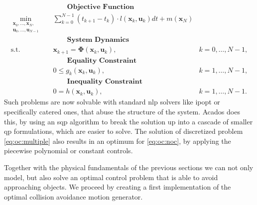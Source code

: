 \begin{subequations}
  \label{eq:oc:multiple}
  \begin{align}
    & \qquad \textbf{Objective Function} \nonumber \\
    \min_{\substack{\bm x_0, \dots, \bm x_N, \\ \bm u_0, \dots, \bm u_{N-1}}} \quad
    & \sum_{k=0}^{N-1} (t_{k+1}-t_k) \cdot l\left(\bm x_k, \bm u_k\right) dt
      + m(\bm x_N) \label{eq:oc:multiple:obj} \\
    & \qquad \textbf{System Dynamics} \nonumber \\
    \textrm{s.t.} \quad & \bm x_{k+1} = \bm \Phi(\bm x_k, \bm u_k), & k = 0,\dots,N-1, \label{eq:oc:multiple:dyn} \\
    & \qquad \textbf{Equality Constraint} \nonumber \\
    & 0 \leq g_k(\bm x_k,\bm u_k), & k=1,\dots,N-1, \label{eq:oc:multiple:eqCons} \\
    & \qquad \textbf{Inequality Constraint} \nonumber \\
    & 0 = h(\bm x_k,\bm u_k), & k=1,\dots,N-1. \label{eq:oc:multiple:ineqCons}
  \end{align}
\end{subequations}
Such problems are now solvable with standard \acrfull{nlp} solvers like \acrfull{ipopt} \cite{wachter_2006} or specifically catered ones, that abuse the structure of the system.
Acados does this, by using an \acrfull{sqp} algorithm to break the solution up into a cascade of smaller \acrfull{qp} formulations, which are easier to solve.
The solution of discretized problem \cref{eq:oc:multiple} also results in an optimum for \cref{eq:oc:noc}, by applying the piecewise polynomial or constant controls.
%
%
\par
Together with the physical fundamentals of the previous sections we can not only model, but also solve an optimal control problem that is able to avoid approaching objects.
We proceed by creating a first implementation of the optimal collision avoidance motion generator.
